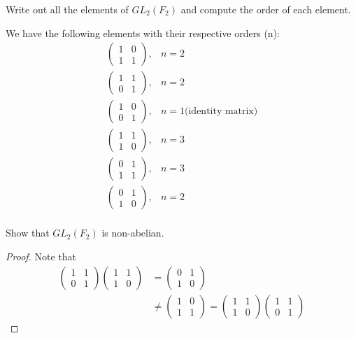 \documentclass[12pt]{article}
\newenvironment{problem}[2][Problem]{\begin{trivlist} \item[\hskip \labelsep {\bfseries #1}\hskip \labelsep {\bfseries #2.}]}{\end{trivlist}}
\newenvironment{solution}[1][Solution]{\begin{trivlist} \item[\hskip \labelsep {\bfseries #1}]}{\end{trivlist}}
\begin{document}
\begin{problem}{2}
  Write out all the elements of $GL_{2}(F_{2})$ and compute the order of each element.
\begin{solution}
  We have the following elements with their respective orders (n):
\begin{align*}
\begin{pmatrix}
  1 & 0\\
  1 & 1
\end{pmatrix}, &n = 2\\
\begin{pmatrix}
  1 & 1\\
  0 & 1
\end{pmatrix}, &n = 2\\
\begin{pmatrix}
  1 & 0\\
  0 & 1
\end{pmatrix}, &n = 1 \text{(identity matrix)}\\
\begin{pmatrix}
  1 & 1\\
  1 & 0
\end{pmatrix}, &n = 3\\
\begin{pmatrix}
  0 & 1\\
  1 & 1
\end{pmatrix}, &n = 3\\
\begin{pmatrix}
  0 & 1\\
  1 & 0
\end{pmatrix}, &n = 2\\
\end{align*}
\end{solution}
\end{problem}
\begin{problem}{3}
  Show that $GL_{2}(F_{2})$ is non-abelian.
\begin{proof}
  Note that
\begin{align*}
\begin{pmatrix}1 & 1\\ 0 & 1\end{pmatrix} \begin{pmatrix} 1 & 1 \\ 1 & 0\end{pmatrix} &= \begin{pmatrix} 0 & 1\\ 1 & 0\end{pmatrix}\\
&\neq \begin{pmatrix} 1 & 0\\ 1 & 1\end{pmatrix} = \begin{pmatrix} 1 & 1\\ 1 & 0\end{pmatrix}\begin{pmatrix} 1 & 1\\ 0 & 1\end{pmatrix}
\end{align*}
\end{proof}
\end{problem}
\end{document}
